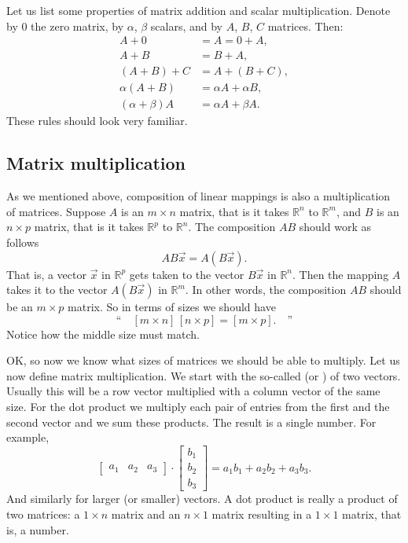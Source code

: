 Let us list some properties of matrix addition and scalar multiplication.
Denote by $0$ the zero matrix, by
$\alpha$, $\beta$ scalars, and by $A$, $B$, $C$ matrices.  Then:
\begin{align*}
A + 0 & = A = 0 + A , \\
A + B & = B + A , \\
(A + B) + C & = A + (B + C) , \\
\alpha(A+B) & = \alpha A+\alpha B, \\
(\alpha+\beta)A & = \alpha A + \beta A.
\end{align*}
These rules should look very familiar.

\subsection{Matrix multiplication}

As we mentioned above, composition of linear mappings is also a
multiplication of matrices.  Suppose $A$ is an $m \times n$ matrix,
that is it takes
${\mathbb R}^n$ to
${\mathbb R}^m$,
and $B$ is an $n \times p$ matrix, that is it takes
${\mathbb R}^p$ to
${\mathbb R}^n$.  The composition $AB$ should work as follows
\begin{equation*}
AB\vec{x} = A(B\vec{x}) .
\end{equation*}
That is, a vector $\vec{x}$ in ${\mathbb R}^p$ gets taken to 
the vector $B\vec{x}$ in
${\mathbb R}^n$.  Then the mapping $A$ takes it to the vector $A(B\vec{x})$
in ${\mathbb R}^m$.  In other words, the composition $AB$ should be an $m
\times p$ matrix.  So in terms of sizes we should have
\begin{equation*}
\text{``} \quad
[ m \times n ]
\,
[ n \times p ]
=
[ m \times p ] . \quad \text{''}
\end{equation*}
Notice how the middle size must match.

OK, so now we know what sizes of matrices we should be able to multiply.
Let us now define matrix multiplication.  We start with the so-called
\emph{} (or \emph{}) of two vectors.
Usually this will be a row vector multiplied
with a column vector of the same size.  For the dot product we multiply
each pair of entries from the first and the second vector and we sum these
products.  The result is a single number.
For example,
\begin{equation*}
\begin{bmatrix}
a_1 & a_2 & a_3
\end{bmatrix}
\cdot
\begin{bmatrix}
b_1 \\
b_2 \\
b_3
\end{bmatrix}
= a_1 b_1 + a_2 b_2 + a_3 b_3 .
\end{equation*}
And similarly for larger (or smaller) vectors.
A dot product is really a product of two matrices: a $1 \times n$ matrix
and an $n \times 1$ matrix resulting in a $1 \times 1$ matrix, that is, a
number.

